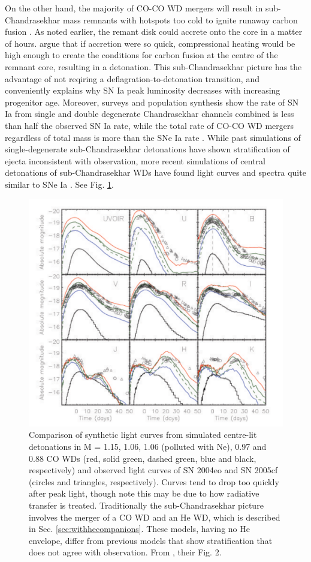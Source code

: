 On the other hand, the majority of CO-CO WD mergers will result in sub-Chandrasekhar mass remnants with hotspots too cold to ignite runaway carbon fusion \citep{vkercj10,loreig09}.  As noted earlier, the remant disk could accrete onto the core in a matter of hours.  \citeauthor{vkercj10} argue that if accretion were so quick, compressional heating would be high enough to create the conditions for carbon fusion at the centre of the remnant core, resulting in a detonation.  This sub-Chandrasekhar picture has the advantage of not reqiring a deflagration-to-detonation transition, and conveniently explains why SN Ia peak luminosity decreases with increasing progenitor age.  Moreover, surveys and population synthesis show the rate of SN Ia from single and double degenerate Chandrasekhar channels combined is less than half the observed SN Ia rate, while the total rate of CO-CO WD mergers regardless of total mass is more than the SNe Ia rate \citep{vkercj10,sim+10}.  While past simulations of single-degenerate sub-Chandrasekhar detonations have shown stratification of ejecta inconsistent with observation, more recent simulations of central detonations of sub-Chandrasekhar WDs have found light curves and spectra quite similar to SNe Ia \citep{vkercj10,howe10,sim+10}.  See Fig. \ref{simfig}.

\begin{figure}
\centerline{\includegraphics[width=0.8\hsize]{simfig.pdf}}
\caption{Comparison of synthetic light curves from simulated centre-lit detonations in M = 1.15, 1.06, 1.06 (polluted with Ne), 0.97 and 0.88 {\Msun} CO WDs (red, solid green, dashed green, blue and black, respectively) and observed light curves of SN 2004eo and SN 2005cf (circles and triangles, respectively).  Curves tend to drop too quickly after peak light, though \cite{sim+10} note this may be due to how radiative transfer is treated.  Traditionally the sub-Chandrasekhar picture involves the merger of a CO WD and an He WD, which is described in Sec. \ref{sec:withhecompanions}.  These models, having no He envelope, differ from previous models that show {\Ni} stratification that does not agree with observation.  From \cite{sim+10}, their Fig. 2.}
\label{simfig}
\end{figure}

